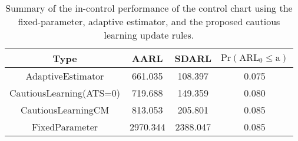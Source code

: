 \begin{table}[!h]

\caption{Summary of the in-control performance of the control chart using the fixed-parameter, adaptive estimator, and the proposed cautious learning update rules.}
\centering
\begin{tabular}[t]{cccc}
\toprule
Type & AARL & SDARL & $\text{Pr}(\text{ARL}_0 \leq \text{a})$\\
\midrule
AdaptiveEstimator & 661.035 & 108.397 & 0.075\\
CautiousLearning(ATS=0) & 719.688 & 149.359 & 0.080\\
CautiousLearningCM & 813.053 & 205.801 & 0.085\\
FixedParameter & 2970.344 & 2388.047 & 0.085\\
\bottomrule
\end{tabular}
\end{table}
